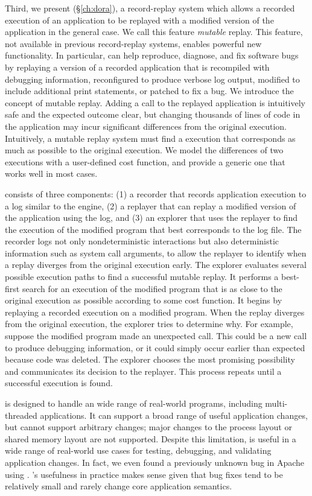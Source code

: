 Third, we present \dora (\S\ref{ch:dora}), a record-replay system which
allows a recorded execution of an application to be replayed with a modified
version of the application in the general case. We call this feature {\em mutable}
replay.  This feature, not available in previous
record-replay systems, enables powerful new functionality. In particular, \dora
can help reproduce, diagnose, and fix software bugs by replaying a version of a
recorded application that is recompiled with debugging information, reconfigured
to produce verbose log output, modified to include additional print statements,
or patched to fix a bug.
We introduce the concept of mutable replay. Adding a  call
to the replayed application is intuitively safe and the expected outcome clear,
but changing thousands of lines of code in the application may incur significant
differences from the original execution. Intuitively, a mutable replay system
must find a execution that corresponds as much as possible to the original
execution. We model the differences of two executions with a user-defined cost
function, and provide a generic one that works well in most cases.

\dora consists of three components: (1) a recorder that records application
execution to a log similar to the \scribe engine, (2) a replayer that can replay
a modified version of the application using the log, and (3) an explorer that
uses the replayer to find the execution of the modified program that best
corresponds to the log file. The recorder logs not only nondeterministic
interactions but also deterministic information such as system call arguments,
to allow the replayer to identify when a replay diverges from the original
execution early.
The explorer evaluates several possible execution paths to find a successful
mutable replay. It performs a best-first search for an execution of
the modified program that is as close to the original execution as
possible according to some cost function. It begins by replaying a
recorded execution on a modified program. When the replay diverges
from the original execution, the explorer tries to determine
why. For example, suppose the modified program made an unexpected
 call. This could be a new call to produce debugging
information, or it could simply occur earlier than expected because
code was deleted. The explorer chooses the most promising possibility
and communicates its decision to the replayer. This process repeats
until a successful execution is found.

{\dora} is designed to handle an wide range of real-world programs, including
multi-threaded applications. It can support a broad range of useful application
changes, but cannot support arbitrary changes; major changes to the process
layout or shared memory layout are not supported. Despite this limitation,
{\dora} is useful in a wide range of real-world use cases for testing,
debugging, and validating application changes. In fact, we even found a
previously unknown bug in Apache using {\dora}. {\dora}'s usefulness in practice
makes sense given that bug fixes tend to be relatively small and rarely change
core application semantics.

